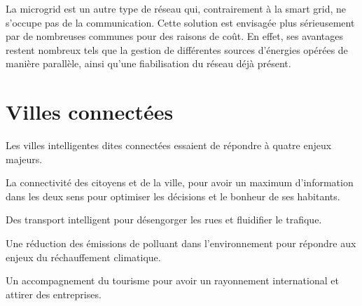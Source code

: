 
La microgrid est un autre type de réseau qui, contrairement à la smart grid, ne s'occupe pas de la communication.
Cette solution est envisagée plus sérieusement par de nombreuses communes pour des raisons de coût. En effet, ses
avantages restent nombreux tels que la gestion de différentes sources d'énergies opérées de manière parallèle,
ainsi qu'une fiabilisation du réseau déjà présent.




\section{Villes connectées}

Les villes intelligentes dites connectées essaient de répondre à quatre enjeux majeurs.

La connectivité des citoyens et de la ville, pour avoir un maximum d'information dans les
deux sens pour optimiser les décisions et le bonheur de ses habitants.

Des transport intelligent pour désengorger les rues et fluidifier le trafique.

Une réduction des émissions de polluant dans l'environnement pour répondre aux enjeux du
réchauffement climatique.

Un accompagnement du tourisme pour avoir un rayonnement international et attirer des entreprises.

